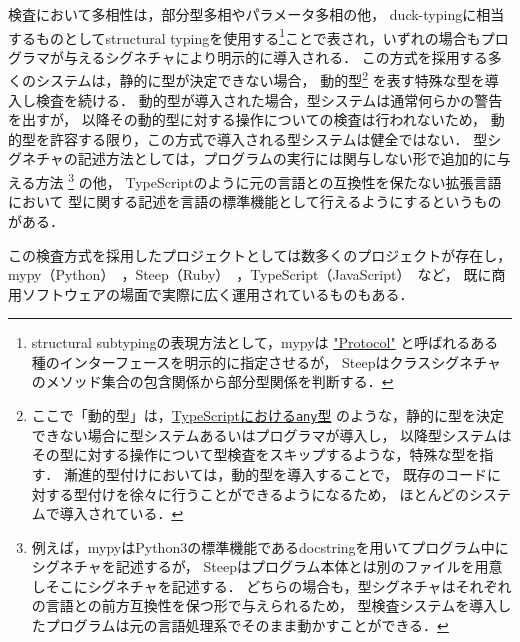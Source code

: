 検査において多相性は，部分型多相やパラメータ多相の他，
duck-typingに相当するものとしてstructural typingを使用する\footnote{
  structural subtypingの表現方法として，mypyは
  \href{https://mypy.readthedocs.io/en/latest/protocols.html\#protocols-and-structural-subtyping}{"Protocol"}
  と呼ばれるある種のインターフェースを明示的に指定させるが，
  Steepはクラスシグネチャのメソッド集合の包含関係から部分型関係を判断する．%
}ことで表され，いずれの場合もプログラマが与えるシグネチャにより明示的に導入される．
この方式を採用する多くのシステムは，静的に型が決定できない場合，
動的型\footnote{
  ここで「動的型」は，\href{https://www.typescriptlang.org/docs/handbook/basic-types.html\#any}{TypeScriptにおける\texttt{any}型}
  のような，静的に型を決定できない場合に型システムあるいはプログラマが導入し，
  以降型システムはその型に対する操作について型検査をスキップするような，特殊な型を指す．
  漸進的型付けにおいては，動的型を導入することで，
  既存のコードに対する型付けを徐々に行うことができるようになるため，
  ほとんどのシステムで導入されている．
} を表す特殊な型を導入し検査を続ける．
動的型が導入された場合，型システムは通常何らかの警告を出すが，
以降その動的型に対する操作についての検査は行われないため，
動的型を許容する限り，この方式で導入される型システムは健全ではない．
型シグネチャの記述方法としては，プログラムの実行には関与しない形で追加的に与える方法
\footnote{
  例えば，mypyはPython3の標準機能であるdocstringを用いてプログラム中にシグネチャを記述するが，
  Steepはプログラム本体とは別のファイルを用意しそこにシグネチャを記述する．
  どちらの場合も，型シグネチャはそれぞれの言語との前方互換性を保つ形で与えられるため，
  型検査システムを導入したプログラムは元の言語処理系でそのまま動かすことができる．
} の他，
TypeScriptのように元の言語との互換性を保たない拡張言語において
型に関する記述を言語の標準機能として行えるようにするというものがある．

この検査方式を採用したプロジェクトとしては数多くのプロジェクトが存在し，
mypy（Python）~\cite{mypy}，Steep（Ruby）~\cite{steep}，TypeScript（JavaScript）~\cite{typescript}など，
既に商用ソフトウェアの場面で実際に広く運用されているものもある．\

